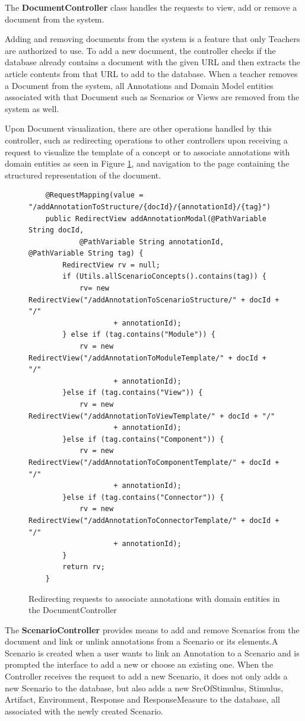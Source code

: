 \documentclass[conference]{IEEEtran}
\begin{document}
The \textbf{DocumentController} class handles the requests to view, add or remove a document from the system.

Adding and removing documents from the system is a feature that only Teachers are authorized to use. 
To add a new document, the controller checks if the database already contains a document with the given URL and then extracts the article contents from that URL to add to the database. When a teacher removes a Document from the system, all Annotations and Domain Model entities associated with that Document such as Scenarios or Views are removed from the system as well.

Upon Document visualization, there are other operations handled by this controller, such as redirecting operations to other controllers upon receiving a request to visualize the template of a concept or to associate annotations with domain entities as seen in Figure \ref{figure:documentControllerLinkAnnotation}, and navigation to the page containing the structured representation of the document.

\begin{figure}
\lstset{style=customjava, basicstyle=\tiny}
\begin{lstlisting}
	@RequestMapping(value = "/addAnnotationToStructure/{docId}/{annotationId}/{tag}")
	public RedirectView addAnnotationModal(@PathVariable String docId,
			@PathVariable String annotationId, @PathVariable String tag) {
		RedirectView rv = null;
		if (Utils.allScenarioConcepts().contains(tag)) {
			rv= new RedirectView("/addAnnotationToScenarioStructure/" + docId + "/"
					+ annotationId);
		} else if (tag.contains("Module")) {
			rv = new RedirectView("/addAnnotationToModuleTemplate/" + docId + "/"
					+ annotationId);
		}else if (tag.contains("View")) {
			rv = new RedirectView("/addAnnotationToViewTemplate/" + docId + "/"
					+ annotationId);
		}else if (tag.contains("Component")) {
			rv = new RedirectView("/addAnnotationToComponentTemplate/" + docId + "/"
					+ annotationId);
		}else if (tag.contains("Connector")) {
			rv = new RedirectView("/addAnnotationToConnectorTemplate/" + docId + "/"
					+ annotationId);
		}
		return rv;
	}	
\end{lstlisting}
\caption{Redirecting requests to associate annotations with domain entities in the DocumentController}
\label{figure:documentControllerLinkAnnotation}
\end{figure}

The \textbf{ScenarioController} provides means to add and remove Scenarios from the document and link or unlink annotations from a Scenario or its elements.A Scenario is created when a user wants to link an Annotation to a Scenario and is prompted the interface to add a new or choose an existing one. When the Controller receives the request to add a new Scenario, it does not only adds a new Scenario to the database, but also adds a new SrcOfStimulus, Stimulus, Artifact, Environment, Response and ResponseMeasure to the database, all associated with the newly created Scenario. 
\end{document}
